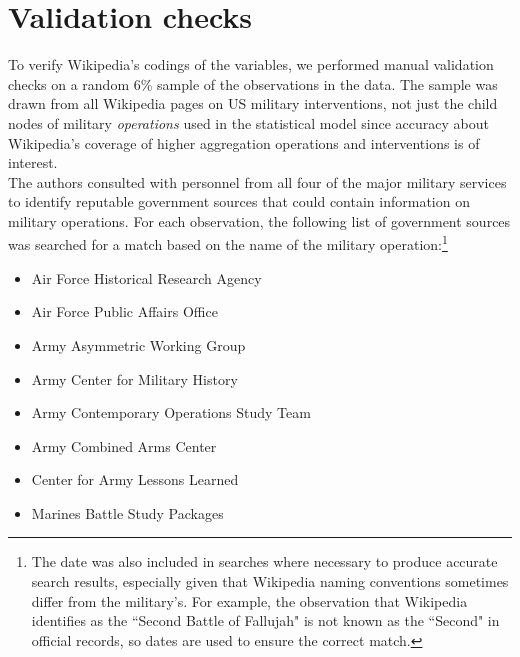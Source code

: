 \documentclass[fleqn,12pt]{article}
\begin{document}
\section{Validation checks}
To verify Wikipedia's codings of the variables, we performed manual validation checks on a random 6\% sample of the observations in the data. The sample was drawn from all Wikipedia pages on US military interventions, not just the child nodes of military \textit{operations} used in the statistical model since accuracy about Wikipedia's coverage of higher aggregation operations and interventions is of interest. \\

The authors consulted with personnel from all four of the major military services to identify reputable government sources that could contain information on military operations. For each observation, the following list of government sources was searched for a match based on the name of the military operation:\footnote{The date was also included in searches where necessary to produce accurate search results, especially given that Wikipedia naming conventions sometimes differ from the military's. For example, the observation that Wikipedia identifies as the ``Second Battle of Fallujah" is not known as the ``Second" in official records, so dates are used to ensure the correct match.} \\

\begin{itemize}
    \item Air Force Historical Research Agency
    \item Air Force Public Affairs Office
    \item Army Asymmetric Working Group
    \item Army Center for Military History
    \item Army Contemporary Operations Study Team
    \item Army Combined Arms Center
    \item Center for Army Lessons Learned
    \item Marines Battle Study Packages
\end{itemize}
\end{document}
